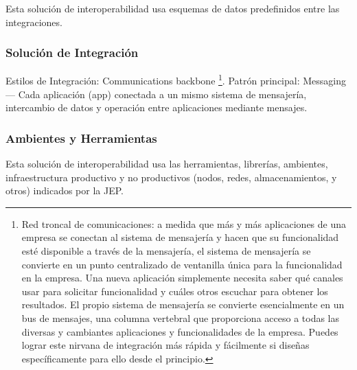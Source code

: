\documentclass[
  paper=a4,
  ,captions=tableheading
]{scrartcl}
\begin{document}
Esta solución de interoperabilidad usa esquemas de datos predefinidos
entre las integraciones.

\subsubsection{Solución de
Integración}\label{sec:soluciuxf3n-de-integraciuxf3n}

Estilos de Integración: Communications backbone \footnote{Red troncal de
  comunicaciones: a medida que más y más aplicaciones de una empresa se
  conectan al sistema de mensajería y hacen que su funcionalidad esté
  disponible a través de la mensajería, el sistema de mensajería se
  convierte en un punto centralizado de ventanilla única para la
  funcionalidad en la empresa. Una nueva aplicación simplemente necesita
  saber qué canales usar para solicitar funcionalidad y cuáles otros
  escuchar para obtener los resultados. El propio sistema de mensajería
  se convierte esencialmente en un bus de mensajes, una columna
  vertebral que proporciona acceso a todas las diversas y cambiantes
  aplicaciones y funcionalidades de la empresa. Puedes lograr este
  nirvana de integración más rápida y fácilmente si diseñas
  específicamente para ello desde el principio.}. Patrón principal:
Messaging --- Cada aplicación (app) conectada a un mismo sistema de
mensajería, intercambio de datos y operación entre aplicaciones mediante
mensajes.

\subsubsection{Ambientes y
Herramientas}\label{sec:ambientes-y-herramientas}

Esta solución de interoperabilidad usa las herramientas, librerías,
ambientes, infraestructura productivo y no productivos (nodos, redes,
almacenamientos, y otros) indicados por la JEP.
\end{document}
